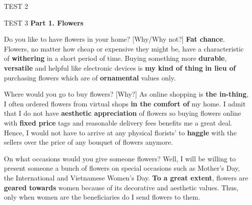 \begin{glossarymc}[Cambridge 8]
\begin{test}{TEST 2}
\begin{VocabHighlights}
    \end{VocabHighlights}
    \end{test}

    \begin{test}{TEST 3}
    \noindent
    \textbf{Part 1. Flowers}
    \begin{qa}{Do you like to have flowers in your home? [Why/Why not?]}
    \textbf{Fat chance}. Flowers, no matter how cheap or expensive they might be, have a characteristic of \textbf{withering} in a short period of time. Buying something more \textbf{durable}, \textbf{versatile} and helpful like electronic devices is \textbf{my kind of thing} \textbf{in lieu of} purchasing flowers which are of \textbf{ornamental} values only.
    \end{qa}

    \begin{qa}{Where would you go to buy flowers? [Why?]}
    As online shopping is \textbf{the in-thing}, I often ordered flowers from virtual shops \textbf{in the comfort of} my home. I admit that I do not have \textbf{aesthetic appreciation} of flowers so buying flowers online with \textbf{fixed price} tags and reasonable delivery fees benefits me a great deal. Hence, I would not have to arrive at any physical florists' to \textbf{haggle} with the sellers over the price of any bouquet of flowers anymore.
    \end{qa}

    \begin{qa}{On what occasions would you give someone flowers?}
    Well, I will be willing to present someone a bunch of flowers on special occasions such as Mother's Day, the International and Vietnamese Women's Day. \textbf{To a great extent}, flowers are \textbf{geared towards} women because of its decorative and aesthetic values. Thus, only when women are the beneficiaries do I send flowers to them.
    \end{qa}


\end{test}
\end{glossarymc}
